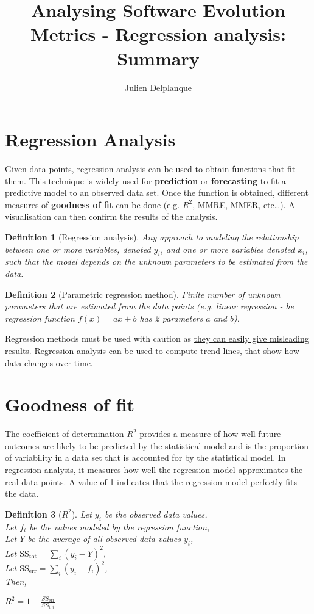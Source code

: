 \documentclass[a4paper,11pt]{report}
\title{Analysing Software Evolution Metrics - Regression analysis: Summary}
\author{Julien Delplanque}
\newtheorem{definition}{Definition}
\begin{document}
\maketitle
\newpage

\section{Regression Analysis}
Given data points, regression analysis can be used to obtain functions that fit
them. This technique is widely used for \textbf{prediction} or
\textbf{forecasting} to fit a predictive model to an observed data set. Once
the function is obtained, different measures of \textbf{goodness of fit} can be
done (e.g. $R^2$, MMRE, MMER, etc\dots). A visualisation can then confirm the
results of the analysis.

\begin{definition}[Regression analysis]
Any approach to modeling the relationship between one or more variables, denoted
$y_i$, and one or more variables denoted $x_i$, such that the model depends on
the unknown parameters to be estimated from the data.
\end{definition}

\begin{definition}[Parametric regression method]
Finite number of unknown parameters that are estimated from the data points
(e.g. linear regression - he regression function $f(x)=ax+b$ has 2 parameters
$a$ and $b$).
\end{definition}

Regression methods must be used with caution as \underline{they can easily give
misleading results}. Regression analysis can be used to compute trend lines,
that show how data changes over time.

\section{Goodness of fit}
The coefficient of determination $R^2$ provides a measure of how well future
outcomes are likely to be predicted by the statistical model and is the
proportion of variability in a data set that is accounted for by the statistical
model. In regression analysis, it measures how well the regression model
approximates the real data points. A value of 1 indicates that the regression
model perfectly fits the data.

\begin{definition}[$R^2$]
Let $y_i$ be the observed data values,\\
Let $f_i$ be the values modeled by the regression function,\\
Let $Y$ be the average of all observed data values $y_i$,\\
Let $\text{SS}_{\text{tot}} = \sum\limits_{i}{(y_i-Y)^2}$,\\
Let $\text{SS}_{\text{err}} = \sum\limits_{i}{(y_i-f_i)^2}$,\\

Then,
\begin{center}
$R^2 = 1 - \frac{SS_{\text{err}}}{SS_{\text{tot}}}$
\end{center}
\end{definition}
\end{document}
